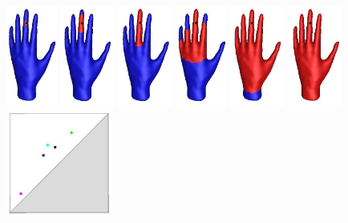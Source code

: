 %
\begin{figure}[t!] 
\begin{center} 
\includegraphics[height = 3.3cm]{figures/dist1} 
\includegraphics[height = 3.3cm]{figures/dist2} 
\includegraphics[height = 3.3cm]{figures/dist3}
\includegraphics[height = 3.3cm]{figures/dist4} 
\includegraphics[height = 3.3cm]{figures/dist5} 
\includegraphics[height = 3.3cm]{figures/dist6}
\includegraphics[height = 3.5cm]{figures/PD3}  

\end{center}
\end{figure}
